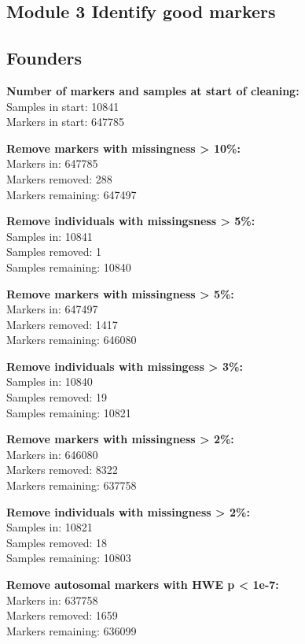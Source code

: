 \documentclass[]{article}
\begin{document}
\subsection{Module 3 Identify good
markers}\label{module-3-identify-good-markers}

\subsection{Founders}\label{founders}

\textbf{Number of markers and samples at start of cleaning:}\\
Samples in start: 10841\\
Markers in start: 647785

\textbf{Remove markers with missingness \textgreater{} 10\%:}\\
Markers in: 647785\\
Markers removed: 288\\
Markers remaining: 647497

\textbf{Remove individuals with missingsness \textgreater{} 5\%:}\\
Samples in: 10841\\
Samples removed: 1\\
Samples remaining: 10840

\textbf{Remove markers with missingness \textgreater{} 5\%:}\\
Markers in: 647497\\
Markers removed: 1417\\
Markers remaining: 646080

\textbf{Remove individuals with missingess \textgreater{} 3\%:}\\
Samples in: 10840\\
Samples removed: 19\\
Samples remaining: 10821

\textbf{Remove markers with missingness \textgreater{} 2\%:}\\
Markers in: 646080\\
Markers removed: 8322\\
Markers remaining: 637758

\textbf{Remove individuals with missingness \textgreater{} 2\%:}\\
Samples in: 10821\\
Samples removed: 18\\
Samples remaining: 10803

\textbf{Remove autosomal markers with HWE p \textless{} 1e-7:}\\
Markers in: 637758\\
Markers removed: 1659\\
Markers remaining: 636099
\end{document}
